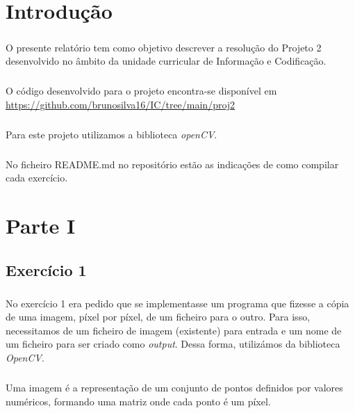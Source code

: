 \documentclass{report}
\begin{document}
\clearpage
{}

\chapter{Introdução}
\label{chap.introducao}
\paragraph{}
O presente relatório tem como objetivo descrever a resolução do Projeto 2 desenvolvido no âmbito da unidade curricular de Informação e Codificação.
\paragraph{}
O código desenvolvido para o projeto encontra-se disponível em \url{https://github.com/brunosilva16/IC/tree/main/proj2}
\paragraph{}
Para este projeto utilizamos a biblioteca \textit{openCV}.
\paragraph{}
No ficheiro README.md no repositório estão as indicações de como compilar cada exercício.


\chapter{Parte I}
\label{chap.ParteI}
\section{Exercício 1}
\paragraph{}
No exercício 1 era pedido que se implementasse um programa que fizesse a cópia de uma imagem, píxel por píxel, de um ficheiro para o outro. Para isso, necessitamos de um ficheiro de imagem (existente) para entrada e um nome de um ficheiro para ser criado como \textit{output}. Dessa forma, utilizámos da biblioteca \textit{OpenCV}.
\paragraph{}
Uma imagem é a representação de um conjunto de pontos definidos por valores numéricos, formando uma matriz onde cada ponto é um píxel.
\end{document}
